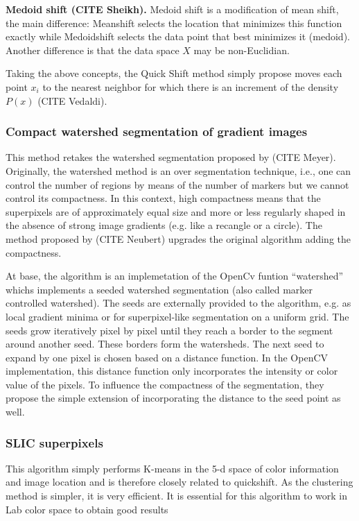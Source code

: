 \begin{description}
 \item \textbf{Medoid shift (CITE Sheikh).} Medoid shift is a modification of mean shift, the main difference: Meanshift selects the location that minimizes this function exactly while Medoidshift selects the data point that best minimizes it (medoid). Another difference is that the data space $X$ may be non-Euclidian.
\end{description}

Taking the above concepts, the Quick Shift method simply propose moves each point $x_i$ to the nearest neighbor for which there is an increment of the density $P(x)$ (CITE Vedaldi).  


\subsubsection{Compact watershed segmentation of gradient images}
This method retakes the watershed segmentation proposed by (CITE Meyer). Originally, the watershed method is an over segmentation technique, i.e., one can control the number of regions by means of the number of markers but we cannot control its compactness.  In this context, high compactness means that the superpixels are of approximately equal size and more or less regularly shaped in the absence of strong image gradients (e.g. like a recangle or a circle). The method proposed by (CITE Neubert) upgrades the original algorithm adding the compactness. 

At base, the algorithm is an implemetation of the OpenCv funtion ``watershed'' whichs implements a seeded watershed segmentation (also called marker controlled watershed). The seeds are externally provided to the algorithm, e.g. as local gradient minima or for superpixel-like segmentation on a uniform grid. The seeds grow iteratively pixel by pixel until they reach a border to the segment around another seed. These borders form the watersheds. The next seed to expand by one pixel is chosen based on a distance function. In the OpenCV implementation, this distance function only incorporates the intensity or color value of the pixels. To influence the compactness of the segmentation, they propose the simple extension of incorporating the distance to the seed point as well.


\subsubsection{SLIC superpixels}
This algorithm simply performs K-means in the 5-d space of color information and image location and is therefore closely related to quickshift. As the clustering method is simpler, it is very efficient. It is essential for this algorithm to work in Lab color space to obtain good results

